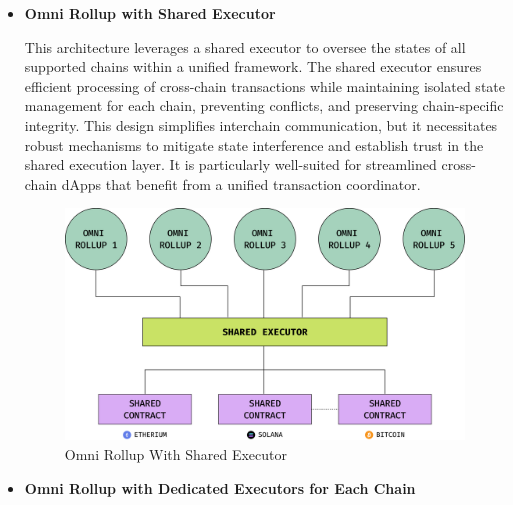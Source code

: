 \begin{itemize}
    \item \textbf{Omni Rollup with Shared Executor}
    
    This architecture leverages a shared executor to oversee the states of all supported chains within a unified framework. The shared executor ensures efficient processing of cross-chain transactions while maintaining isolated state management for each chain, preventing conflicts, and preserving chain-specific integrity. This design simplifies interchain communication, but it necessitates robust mechanisms to mitigate state interference and establish trust in the shared execution layer. It is particularly well-suited for streamlined cross-chain dApps that benefit from a unified transaction coordinator.

 \begin{figure}[h!]
    \centering
    \includegraphics[width=0.9\linewidth]{figure/shared.png}
    \caption{Omni Rollup With Shared Executor}
    \label{fig:shared_rollup}
\end{figure}


    \item \textbf{Omni Rollup with Dedicated Executors for Each Chain}  


\end{itemize}
